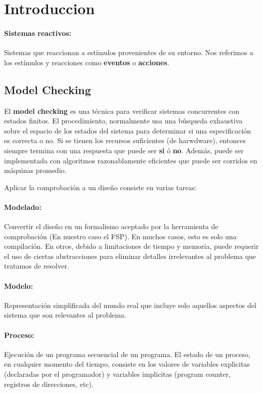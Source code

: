 \section{Introduccion}
\paragraph{Sistemas reactivos:} Sistemas que reaccionan a estímulos provenientes de su entorno. Nos referimos a los estímulos y reacciones como \textbf{eventos} o \textbf{acciones}.


\subsection{Model Checking}
El \textbf{model checking} es una técnica para verificar sistemas concurrentes con estados finitos. El procedimiento, normalmente usa una búsqueda exhaustiva sobre el espacio de los estados del sistema para determinar si una especificación es correcta o no. Si se tienen los recursos suficientes (de harwdware), entonces siempre termina con una respuesta que puede ser \textbf{si} ó \textbf{no}. Además, puede ser implementada con algoritmos razonablamente eficientes que puede ser corridos en máquinas promedio. 

Aplicar la comprobación a un diseño consiste en varias tareas:

\paragraph{Modelado:} Convertir el diseño en un formalismo aceptado por la herramienta de comprobación (En nuestro caso el FSP). En muchos casos, esto es solo una compilación. En otros, debido a limitaciones de tiempo y memoria, puede requerir el uso de ciertas abstracciones para eliminar detalles irrelevantes al problema que tratamos de resolver.


\paragraph{Modelo:} Representación simplificada del mundo real que incluye solo aquellos aspectos del sistema que son relevantes al problema.

\paragraph{Proceso:} Ejecución de un programa secuencial de un programa. El estado de un proceso, en cualquier momento del tiempo, consiste en los valores de variables explicitas (declaradas por el programador) y variables implicitas (program counter, registros de direcciones, etc). 

